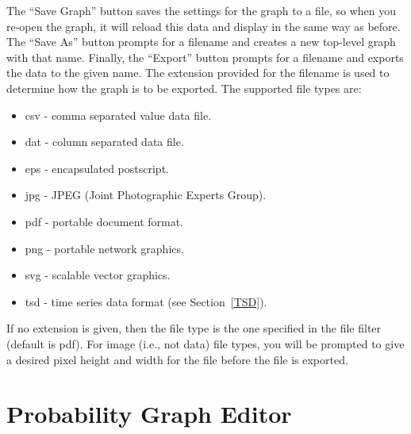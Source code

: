 \documentclass[titlepage,11pt]{article}
\begin{document}
The ``Save Graph'' button saves the settings for the graph to 
a file, so when you re-open the graph, it will reload this data and display 
in the same way as before.  The ``Save As'' button prompts for a 
filename and creates a new top-level graph with that name.  
Finally, the ``Export'' button prompts for a filename and exports
the data to the given name.  The extension provided for the filename 
is used to determine how the graph is to be exported. The
supported file types are: 
\begin{itemize}
\item csv - comma separated value data file. 
\item dat - column separated data file. 
\item eps - encapsulated postscript. 
\item jpg - JPEG (Joint Photographic Experts Group). 
\item pdf - portable document format.
\item png - portable network graphics. 
\item svg - scalable vector graphics.
\item tsd - time series data format (see Section~\ref{TSD}).
\end{itemize}
If no extension is given, then the file type is the one
specified in the file filter (default is pdf).  For image (i.e.,
not data) file types, you will be prompted to give a desired
pixel height and width for the file before the file is exported. 

\section{\label{ProbEdit}Probability Graph Editor}
\end{document}
